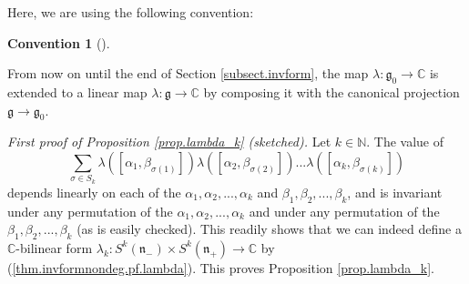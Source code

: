 \documentclass
[numbers=enddot,12pt,final,onecolumn,german,notitlepage]{scrartcl}%
\theoremstyle{definition}
\newtheorem{conv}[theo]{Convention}
\newenvironment{Convention}[1][]
{\begin{conv}[#1]\begin{leftbar}}
{\end{leftbar}\end{conv}}
\begin{document}
Here, we are using the following convention:

\begin{Convention}
From now on until the end of Section \ref{subsect.invform}, the map
$\lambda:\mathfrak{g}_{0}\rightarrow\mathbb{C}$ is extended to a linear map
$\lambda:\mathfrak{g}\rightarrow\mathbb{C}$ by composing it with the canonical
projection $\mathfrak{g}\rightarrow\mathfrak{g}_{0}$.
\end{Convention}

\textit{First proof of Proposition \ref{prop.lambda_k} (sketched).} Let
$k\in\mathbb{N}$. The value of
\[
\sum\limits_{\sigma\in S_{k}}\lambda\left(  \left[  \alpha_{1},\beta
_{\sigma\left(  1\right)  }\right]  \right)  \lambda\left(  \left[  \alpha
_{2},\beta_{\sigma\left(  2\right)  }\right]  \right)  ...\lambda\left(
\left[  \alpha_{k},\beta_{\sigma\left(  k\right)  }\right]  \right)
\]
depends linearly on each of the $\alpha_{1},\alpha_{2},...,\alpha_{k}$ and
$\beta_{1},\beta_{2},...,\beta_{k}$, and is invariant under any permutation of
the $\alpha_{1},\alpha_{2},...,\alpha_{k}$ and under any permutation of the
$\beta_{1},\beta_{2},...,\beta_{k}$ (as is easily checked). This readily shows
that we can indeed define a $\mathbb{C}$-bilinear form $\lambda_{k}%
:S^{k}\left(  \mathfrak{n}_{-}\right)  \times S^{k}\left(  \mathfrak{n}%
_{+}\right)  \rightarrow\mathbb{C}$ by (\ref{thm.invformnondeg.pf.lambda}).
This proves Proposition \ref{prop.lambda_k}.
\end{document}
